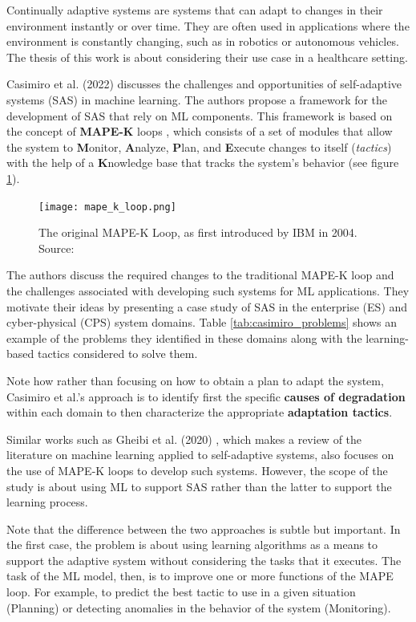 \documentclass[../main.tex]{subfiles}
\begin{document}
    Continually adaptive systems are systems that can adapt to changes in their environment instantly or over time. They are often used in applications where the environment is constantly changing, such as in robotics or autonomous vehicles. The thesis of this work is about considering their use case in a healthcare setting. 

    Casimiro et al. (2022) discusses the challenges and opportunities of self-adaptive systems (SAS) in machine learning. The authors propose a framework for the development of SAS that rely on ML components. This framework is based on the concept of \textbf{MAPE-K} loops \cite{kephartVisionAutonomicComputing2003}, which consists of a set of modules that allow the system to \textbf{M}onitor, \textbf{A}nalyze, \textbf{P}lan, and \textbf{E}xecute changes to itself (\textit{tactics}) with the help of a \textbf{K}nowledge base that tracks the system's behavior (see figure \ref{fig:mape-k}).

    \begin{figure}[h]
        \centering
        \texttt{[image: mape\_k\_loop.png]}
        \caption{The original MAPE-K Loop, as first introduced by IBM in 2004. Source: \cite{redbooks_practical_2004}}
        \label{fig:mape-k}
    \end{figure}
    
    The authors discuss the required changes to the traditional MAPE-K loop and the challenges associated with developing such systems for ML applications. They motivate their ideas by presenting a case study of SAS in the enterprise (ES) and cyber-physical (CPS) system domains. Table \ref{tab:casimiro_problems} shows an example of the problems they identified in these domains along with the learning-based tactics considered to solve them.
    
    Note how rather than focusing on how to obtain a plan to adapt the system, Casimiro et al.'s approach is to identify first the specific \textbf{causes of degradation} within each domain to then characterize the appropriate \textbf{adaptation tactics}. 

    Similar works such as Gheibi et al. (2020) \cite{gheibiApplyingMachineLearning2020}, which makes a review of the literature on machine learning applied to self-adaptive systems, also focuses on the use of MAPE-K loops to develop such systems. However, the scope of the study is about using ML to support SAS rather than the latter to support the learning process.
    
    Note that the difference between the two approaches is subtle but important. In the first case, the problem is about using learning algorithms as a means to support the adaptive system without considering the tasks that it executes. The task of the ML model, then, is to improve one or more functions of the MAPE loop. For example, to predict the best tactic to use in a given situation (Planning) or detecting anomalies in the behavior of the system (Monitoring).
\end{document}
